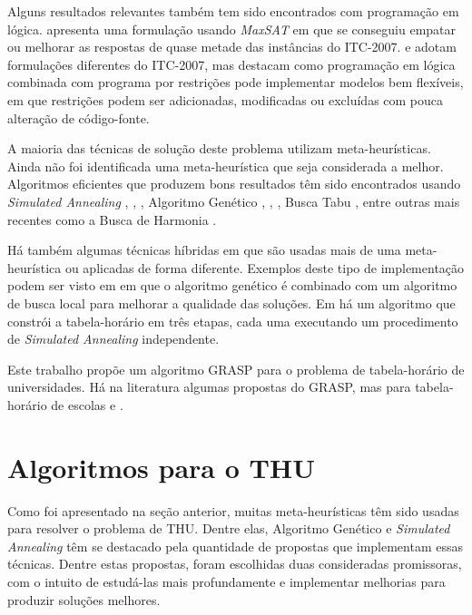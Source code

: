 \documentclass[11pt]{article}
\begin{document}
Alguns resultados relevantes também tem sido encontrados com programação em lógica. \cite{springerlink:10.1007/s10479-012-1081-x} apresenta uma formulação usando \textit{MaxSAT} em que se conseguiu empatar ou melhorar as respostas de quase metade das instâncias do ITC-2007. \cite{Gueret95buildinguniversity} e \cite{Goltz99universitytimetabling} adotam formulações diferentes do ITC-2007, mas destacam como programação em lógica combinada com programa por restrições pode implementar modelos bem flexíveis, em que restrições podem ser adicionadas, modificadas ou excluídas com pouca alteração de código-fonte.

A maioria das técnicas de solução deste problema utilizam meta-heurísticas. Ainda não foi identificada uma meta-heurística que seja considerada a melhor.  Algoritmos eficientes que produzem bons resultados têm sido encontrados usando \textit{Simulated Annealing} \cite{3-phaseSA}, \cite{sa_hyper_heuristica}, \cite{Elmohamed98acomparison}, Algoritmo Genético \cite{Erben95agenetic}, \cite{suyanto}, \cite{Kanoh:2008:KGA:1460198.1460201}, Busca Tabu \cite{elloumi2008}, entre outras mais recentes como a Busca de Harmonia \cite{albetar_harmony}.

Há também algumas técnicas híbridas em que são usadas mais de uma meta-heurística ou aplicadas de forma diferente. Exemplos deste tipo de implementação podem ser visto em \cite{massoodian2008} em que o algoritmo genético é combinado com um algoritmo de busca local para melhorar a qualidade das soluções. Em \cite{3-phaseSA} há um algoritmo que constrói a tabela-horário em três etapas, cada uma executando um procedimento de \textit{Simulated Annealing} independente.

Este trabalho propõe um algoritmo GRASP para o problema de tabela-horário de universidades. Há na literatura algumas propostas do GRASP, mas para tabela-horário de escolas \cite{Souza:2004} e \cite{Vieira_agrasp}.



\section{Algoritmos para o THU}
\label{sec:algoritmos}

Como foi apresentado na seção anterior, muitas meta-heurísticas têm sido usadas para resolver o problema de THU. Dentre elas, Algoritmo Genético e \textit{Simulated Annealing} têm se destacado pela quantidade de propostas que implementam essas técnicas. Dentre estas propostas, foram escolhidas duas consideradas promissoras, com o intuito de estudá-las mais profundamente e implementar melhorias para produzir soluções melhores.
\end{document}
